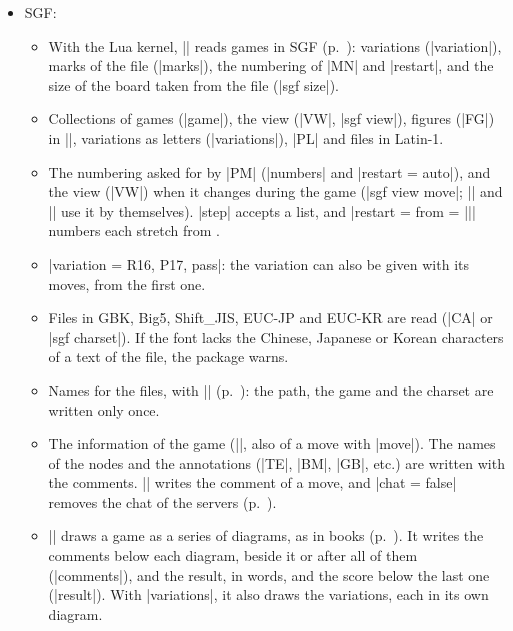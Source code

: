\begin{itemize}
\begin{itemize}
			\item SGF:
				\begin{itemize}
					\item With the Lua kernel, |\sgf| reads games in SGF (p.~\pageref{subsec:sgftablero}): variations (|variation|), marks of the file (|marks|), the numbering of |MN| and |restart|, and the size of the board taken from the file (|sgf size|).
					\item Collections of games (|game|), the view (|VW|, |sgf view|), figures (|FG|) in |\sgfdiagrams|, variations as letters (|variations|), |PL| and files in Latin-1.
					\item The numbering asked for by |PM| (|numbers| and |restart = auto|), and the view (|VW|) when it changes during the game (|sgf view move|; |\sgfdiagrams| and |\sgfanimation| use it by themselves). |step| accepts a list, and |restart = {from = ||}| numbers each stretch from .
					\item |variation = {R16, P17, pass}|: the variation can also be given with its moves, from the first one.
					\item Files in GBK, Big5, Shift\_JIS, EUC-JP and EUC-KR are read (|CA| or |sgf charset|). If the font lacks the Chinese, Japanese or Korean characters of a text of the file, the package warns.
					\item Names for the files, with |\pgfgodefinesgf| (p.~\pageref{subsec:sgfnombres}): the path, the game and the charset are written only once.
					\item The information of the game (|\sgfinfo|, also of a move with |move|). The names of the nodes and the annotations (|TE|, |BM|, |GB|, etc.) are written with the comments. |\sgfcomment| writes the comment of a move, and |chat = false| removes the chat of the servers (p.~\pageref{subsec:sgfdatos}).
					\item |\sgfdiagrams| draws a game as a series of diagrams, as in books (p.~\pageref{subsec:sgfdiagramas}). It writes the comments below each diagram, beside it or after all of them (|comments|), and the result, in words, and the score below the last one (|result|). With |variations|, it also draws the variations, each in its own diagram.

\end{itemize}
\end{itemize}
\end{itemize}
